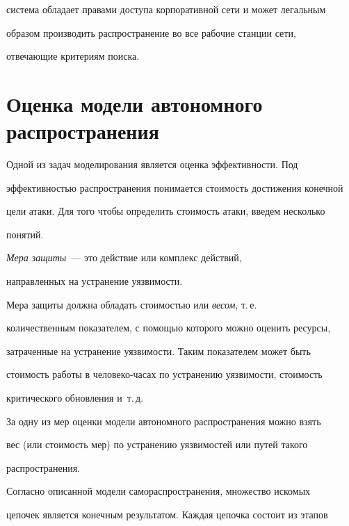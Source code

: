 система обладает правами доступа корпоративной сети и может легальным 


образом производить распространение во все рабочие станции сети, 


отвечающие критериям поиска. 





\section{Оценка модели автономного распространения}


     


     Одной из задач моделирования является оценка эффективности. Под 


эффективностью распространения понимается стоимость достижения конечной 


цели атаки. Для того чтобы определить стоимость атаки, введем несколько 


понятий. 


     


     \textit{Мера защиты}~--- это действие или комплекс действий, 


направленных на устранение уязвимости. 


     


     Мера защиты должна обладать стоимостью или \textit{весом}, т.\,е.\ 


количественным показателем, с помощью которого можно оценить ресурсы, 


затраченные на устранение уязвимости. Таким показателем может быть 


стоимость работы в че\-ло\-ве\-ко-ча\-сах по устранению уязвимости, стоимость 


критического обновления и~т.\,д.


     


     За одну из мер оценки модели автономного распространения можно взять 


вес (или стоимость мер) по устранению уязвимостей или путей такого 


распространения. 


     


     Согласно описанной модели самораспространения, множество искомых 


цепочек является конечным результатом. Каждая цепочка состоит из этапов 


